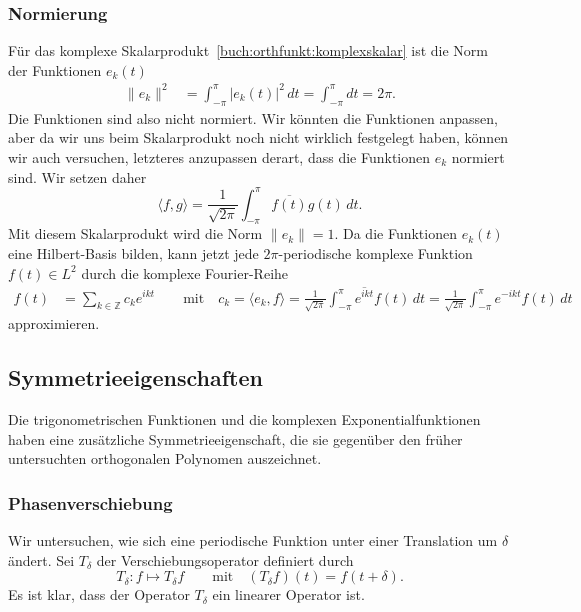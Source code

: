 %
%
\subsubsection{Normierung}
Für das komplexe Skalarprodukt~\eqref{buch:orthfunkt:komplexskalar}
ist die Norm der Funktionen $e_k(t)$
\begin{align*}
\|e_k\|^2
&=
\int_{-\pi}^\pi |e_k(t)|^2\,dt
=
\int_{-\pi}^\pi dt
=
2\pi.
\end{align*}
Die Funktionen sind also nicht normiert.
Wir könnten die Funktionen anpassen, aber da wir uns beim Skalarprodukt
noch nicht wirklich festgelegt haben, können wir auch versuchen, letzteres
anzupassen derart, dass die Funktionen $e_k$ normiert sind.
Wir setzen daher
\begin{equation}
\langle f,g\rangle
=
\frac{1}{\sqrt{2\pi}}
\int_{-\pi}^\pi \overline{f(t)} g(t)\,dt.
\end{equation}
Mit diesem Skalarprodukt wird die Norm $\|e_k\|=1$.
Da die Funktionen $e_k(t)$ eine Hilbert-Basis bilden, kann jetzt jede
$2\pi$-periodische komplexe Funktion $f(t)\in L^2$ durch die komplexe
Fourier-Reihe
\begin{align*}
f(t)
&=
\sum_{k\in\mathbb{Z}} c_k e^{ikt}
\qquad\text{mit}\quad
c_k
=
\langle e_k,f\rangle
=
\frac{1}{\sqrt{2\pi}}
\int_{-\pi}^{\pi}  \overline{e^{ikt}} f(t)\,dt
=
\frac{1}{\sqrt{2\pi}}
\int_{-\pi}^{\pi}  e^{-ikt} f(t)\,dt
\end{align*}
approximieren.

%
%
\subsection{Symmetrieeigenschaften
\label{buch:trigo:subsection:symmetrie}}
Die trigonometrischen Funktionen und die komplexen Exponentialfunktionen
haben eine zusätzliche Symmetrieeigenschaft, die sie gegenüber den früher
untersuchten orthogonalen Polynomen auszeichnet.

%
%
\subsubsection{Phasenverschiebung}
Wir untersuchen, wie sich eine periodische Funktion unter einer
Translation um $\delta$ ändert.
Sei $T_\delta$ der Verschiebungsoperator definiert durch
\[
T_\delta
\colon 
f\mapsto T_\delta f
\qquad\text{mit}\quad
(T_\delta f)(t) = f(t+\delta).
\]
Es ist klar, dass der Operator $T_\delta$ ein linearer Operator ist.

